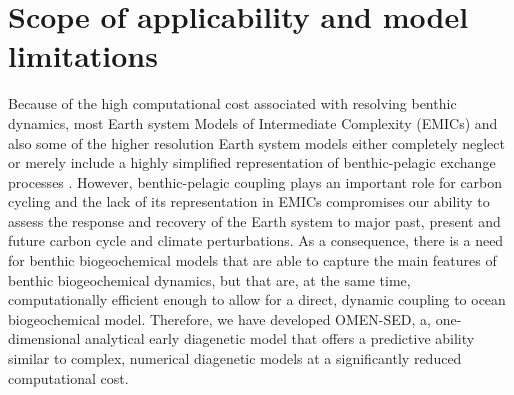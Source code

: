 \documentclass[gmd, manuscript]{copernicus}
\begin{document}
% 


\section{Scope of applicability and model limitations}\label{sec:Appl_Limitations}
Because of the high computational cost associated with resolving benthic dynamics, most Earth system Models of Intermediate Complexity (EMICs) and also some of the higher resolution Earth system models either completely neglect 
or merely include a highly simplified representation of benthic-pelagic exchange processes \citep{hulse_understanding_2017}. However, benthic-pelagic coupling plays an important role for carbon cycling and the lack of its representation 
in EMICs compromises our ability to assess the response and recovery of the Earth system to major past, present and future carbon cycle and climate perturbations. As a consequence, there is a need for benthic biogeochemical models that are 
able to capture the main features of benthic biogeochemical dynamics, but that are, at the same time, computationally efficient enough to allow for a direct, dynamic coupling to ocean biogeochemical model. 
Therefore, we have developed OMEN-SED, a, one-dimensional analytical early diagenetic model that offers a predictive ability similar to complex, numerical diagenetic models at a significantly reduced computational cost. 
\end{document}
